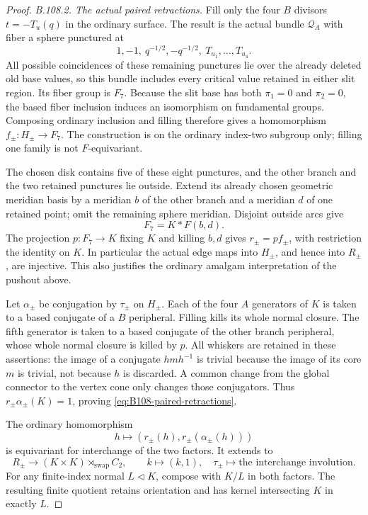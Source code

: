 \begin{proof}
\emph{B.108.2. The actual paired retractions.}
Fill only the four $B$ divisors $t=-T_u(q)$ in the ordinary
surface. The result is the actual bundle $\mathscr Q_A$ with
fiber a sphere punctured at
\[
 1,-1,\ q^{-1/2},-q^{-1/2},\ T_{u_1},\ldots,T_{u_4}.
\]
All possible coincidences of these remaining punctures lie over
the already deleted old base values, so this bundle includes
every critical value retained in either slit region. Its fiber
group is $F_7$. Because the slit base has both $\pi_1=0$ and
$\pi_2=0$, the based fiber inclusion induces an isomorphism on
fundamental groups. Composing ordinary inclusion and filling
therefore gives a homomorphism $f_\pm:H_\pm\to F_7$.
The construction is on the ordinary index-two subgroup only;
filling one family is not $F$-equivariant.

The chosen disk contains five of these eight punctures, and
the other branch and the two retained punctures lie outside.
Extend its already chosen geometric meridian basis by a meridian
$b$ of the other branch and a meridian $d$ of one retained point;
omit the remaining sphere meridian. Disjoint outside arcs give
\[
 F_7=K*F(b,d).
\]
The projection $p:F_7\to K$ fixing $K$ and killing $b,d$ gives
$r_\pm=p f_\pm$, with restriction the identity on $K$.
In particular the actual edge maps into $H_\pm$, and hence into
$R_\pm$, are injective. This also justifies the ordinary amalgam
interpretation of the pushout above.

Let $\alpha_\pm$ be conjugation by $\tau_\pm$ on $H_\pm$.
Each of the four $A$ generators of $K$ is taken to a based
conjugate of a $B$ peripheral. Filling kills its whole normal
closure. The fifth generator is taken to a based conjugate of
the other branch peripheral, whose whole normal closure is
killed by $p$. All whiskers are retained in these assertions:
the image of a conjugate $h m h^{-1}$ is trivial because the
image of its core $m$ is trivial, not because $h$ is discarded.
A common change from the global connector to the vertex cone
only changes those conjugators. Thus
$r_\pm\alpha_\pm(K)=1$, proving
\eqref{eq:B108-paired-retractions}.

The ordinary homomorphism
\[
 h\longmapsto(r_\pm(h),r_\pm(\alpha_\pm(h)))
\]
is equivariant for interchange of the two factors. It extends to
\begin{equation}\label{eq:B108-paired-map}
 R_\pm\longrightarrow (K\times K)\rtimes_{\mathrm{swap}}C_2,
 \qquad k\longmapsto(k,1),\quad
 \tau_\pm\longmapsto\text{the interchange involution}.
\end{equation}
For any finite-index normal $L\triangleleft K$, compose with
$K/L$ in both factors. The resulting finite quotient retains
orientation and has kernel intersecting $K$ in exactly $L$.


\end{proof}
